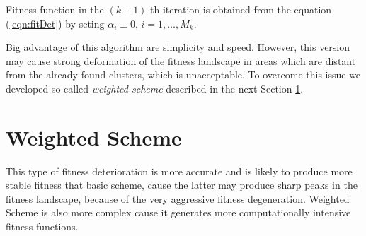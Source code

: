Fitness function in the $(k+1)$-th iteration is obtained from the equation
(\ref{eqn:fitDet}) by seting $\alpha_i \equiv 0, \, i = 1,\ldots,M_k$.



Big advantage of this algorithm are simplicity and speed.
However, this version may cause strong deformation of the
fitness landscape in areas which are distant from the already found clusters,
which is unacceptable. To overcome this issue we
developed so called \textit{weighted scheme} described 
in the next Section \ref{sec:WeightScheme}. 





\section{Weighted Scheme}
\label{sec:WeightScheme}

This type of fitness deterioration is more accurate and is likely to produce
more stable fitness that basic scheme, cause the latter may produce
sharp peaks in the fitness landscape, because of the very aggressive fitness degeneration.
Weighted Scheme is also more complex cause it generates
more computationally intensive fitness functions.

